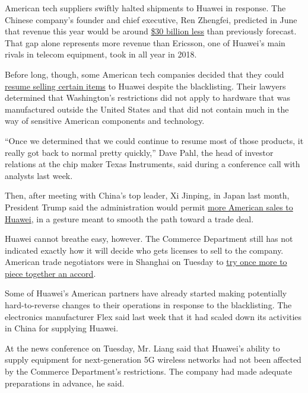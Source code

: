 American tech suppliers swiftly halted shipments to Huawei in response.
The Chinese company's founder and chief executive, Ren Zhengfei,
predicted in June that revenue this year would be around
\href{https://www.nytimes.com/2019/06/17/technology/huawei-trump.html}{\$30
billion less} than previously forecast. That gap alone represents more
revenue than Ericsson, one of Huawei's main rivals in telecom equipment,
took in all year in 2018.

Before long, though, some American tech companies decided that they
could
\href{https://www.nytimes.com/2019/06/25/technology/huawei-trump-ban-technology.html}{resume
selling certain items} to Huawei despite the blacklisting. Their lawyers
determined that Washington's restrictions did not apply to hardware that
was manufactured outside the United States and that did not contain much
in the way of sensitive American components and technology.

``Once we determined that we could continue to resume most of those
products, it really got back to normal pretty quickly,'' Dave Pahl, the
head of investor relations at the chip maker Texas Instruments, said
during a conference call with analysts last week.

Then, after meeting with China's top leader, Xi Jinping, in Japan last
month, President Trump said the administration would permit
\href{https://www.nytimes.com/2019/06/29/world/asia/g20-trump-xi-trade-talks.html}{more
American sales to Huawei}, in a gesture meant to smooth the path toward
a trade deal.

Huawei cannot breathe easy, however. The Commerce Department still has
not indicated exactly how it will decide who gets licenses to sell to
the company. American trade negotiators were in Shanghai on Tuesday to
\href{https://www.nytimes.com/2019/07/29/us/politics/trade-china-trump.html}{try
once more to piece together an accord}.

Some of Huawei's American partners have already started making
potentially hard-to-reverse changes to their operations in response to
the blacklisting. The electronics manufacturer Flex said last week that
it had scaled down its activities in China for supplying Huawei.

At the news conference on Tuesday, Mr. Liang said that Huawei's ability
to supply equipment for next-generation 5G wireless networks had not
been affected by the Commerce Department's restrictions. The company had
made adequate preparations in advance, he said.

